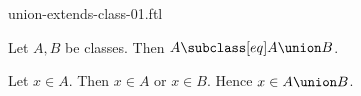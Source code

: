 \documentclass{article}
\begin{document}
\begin{smodule}[creators={Marcel Schütz}]{union-extends-class-01.ftl}

  \begin{fproposition*}[label=8894188219269120]
    Let $A, B$ be classes.
    Then $A \subclass[eq] A \union B$.
  \end{fproposition*}
  \begin{fproof}
    Let $x \in A$.
    Then $x \in A$ or $x \in B$.
    Hence $x \in A \union B$.
  \end{fproof}
\end{smodule}
\end{document}
